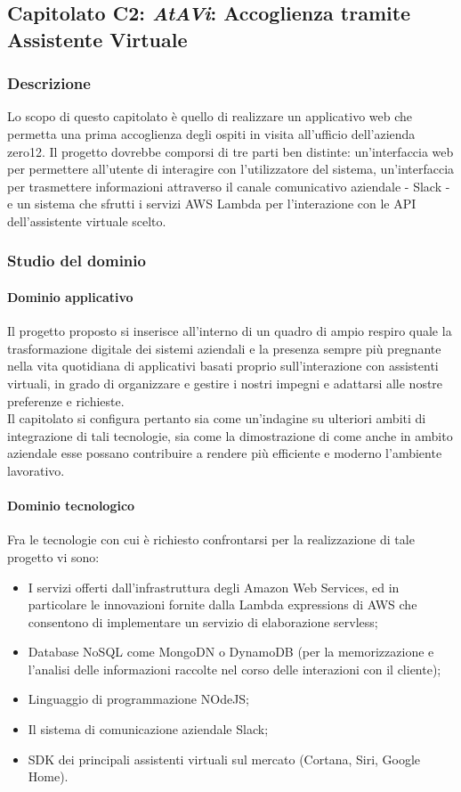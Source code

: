 	\subsection{Capitolato C2: \emph{AtAVi}: Accoglienza tramite Assistente Virtuale}
		\subsubsection{Descrizione}
		Lo scopo di questo capitolato è quello di realizzare un applicativo web che permetta una prima accoglienza degli ospiti in visita all'ufficio 
		dell'azienda zero12. Il progetto dovrebbe comporsi di tre parti ben distinte: un'interfaccia web per permettere all'utente di interagire con 
		l'utilizzatore del sistema, un'interfaccia per trasmettere informazioni attraverso il canale comunicativo aziendale - Slack - e un sistema che 
		sfrutti i servizi AWS Lambda per l'interazione con le API dell'assistente virtuale scelto.
		\subsubsection{Studio del dominio}
			\paragraph{Dominio applicativo}
			Il progetto proposto si inserisce all'interno di un quadro di ampio respiro quale la trasformazione digitale dei sistemi aziendali e la 
			presenza sempre più pregnante nella vita quotidiana di applicativi basati proprio sull'interazione con assistenti virtuali, in grado di 
			organizzare e gestire i nostri impegni e adattarsi alle nostre preferenze e richieste.\\
			Il capitolato si configura pertanto sia come un'indagine su ulteriori ambiti di integrazione di tali tecnologie, sia come la dimostrazione 
			di come anche in ambito aziendale esse possano contribuire a rendere più efficiente e moderno l'ambiente lavorativo.
			\paragraph{Dominio tecnologico}
			Fra le tecnologie con cui è richiesto confrontarsi per la realizzazione di tale progetto vi sono:
			\begin{itemize}
				\item I servizi offerti dall'infrastruttura degli Amazon Web Services, ed in particolare le innovazioni fornite dalla Lambda expressions 
				di AWS che consentono di implementare un servizio di elaborazione servless;
				\item Database NoSQL come MongoDN o DynamoDB (per la memorizzazione e l'analisi delle informazioni raccolte nel corso delle interazioni con il cliente);
				\item Linguaggio di programmazione NOdeJS;
				\item Il sistema di comunicazione aziendale Slack;
				\item SDK dei principali assistenti virtuali sul mercato (Cortana, Siri, Google Home).
			\end{itemize}

